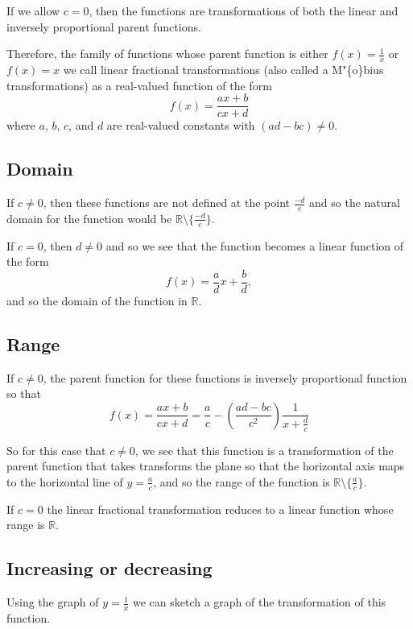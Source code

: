 \documentclass[
]{book}
\theoremstyle{definition}
\theoremstyle{definition}
\theoremstyle{definition}
\theoremstyle{remark}
\begin{document}
If we allow \(c=0\), then the functions are transformations of both the linear and inversely proportional parent functions.

Therefore, the family of functions whose parent function is either \(f(x)=\frac{1}{x}\) or \(f(x)=x\) we call linear fractional transformations (also called a M"\{o\}bius transformations) as a real-valued function of the form \[f(x)=\frac{ax+b}{cx+d}\] where \(a\), \(b\), \(c\), and \(d\) are real-valued constants with \((ad-bc)\neq 0\).

\hypertarget{domain}{%
\subsection{Domain}\label{domain}}

If \(c\neq 0\), then these functions are not defined at the point \(\frac{-d}{c}\) and so the natural domain for the function would be \(\mathbb{R}\setminus \{\frac{-d}{c}\}\).

If \(c=0\), then \(d\neq 0\) and so we see that the function becomes a linear function of the form
\[f(x)= \frac{a}{d} x + \frac{b}{d},\] and so the domain of the function in \(\mathbb{R}\).

\hypertarget{range}{%
\subsection{Range}\label{range}}

If \(c\neq 0\), the parent function for these functions is inversely proportional function so that
\[f(x)=\frac{ax+b}{cx+d} = \frac{a}{c} -\left(\frac{ad-bc}{c^2}\right)\frac{1}{x+\frac{d}{c}}\]

So for this case that \(c\neq 0\), we see that this function is a transformation of the parent function that takes transforms the plane so that the horizontal axis maps to the horizontal line of \(y=\frac{a}{c}\), and so the range of the function is \(\mathbb{R}\setminus \{\frac{a}{c}\}\).

If \(c=0\) the linear fractional transformation reduces to a linear function whose range is \(\mathbb{R}\).

\hypertarget{increasing-or-decreasing-1}{%
\subsection{Increasing or decreasing}\label{increasing-or-decreasing-1}}

Using the graph of \(y=\frac{1}{x}\) we can sketch a graph of the transformation of this function.
\end{document}
